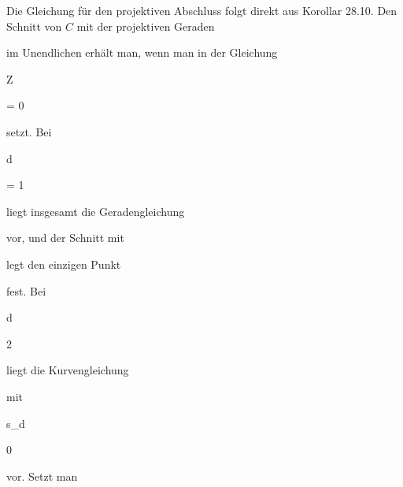 {


Die Gleichung für den projektiven Abschluss folgt direkt aus
Korollar 28.10.
Den Schnitt von $C$ mit der projektiven Geraden

  im Unendlichen erhält man, wenn man in der Gleichung


\mavergleichskette

{\vergleichskette

{Z
}

{ = }{ 0
}

{  }{
}

{    }{
}

{   }{
}

}
{}{}{}
setzt. Bei


\mavergleichskette

{\vergleichskette

{d
}

{ = }{ 1
}

{  }{
}

{    }{
}

{   }{
}

}
{}{}{}
liegt insgesamt die Geradengleichung

 vor, und der Schnitt mit

 legt den einzigen Punkt

 fest. Bei


\mavergleichskette

{\vergleichskette

{d
}

{ \geq }{ 2
}

{  }{
}

{    }{
}

{   }{
}

}
{}{}{}
liegt die Kurvengleichung


 {  }


mit


\mavergleichskette

{\vergleichskette

{s_d
}

{ \neq }{ 0
}

{  }{
}

{    }{
}

{   }{
}

}
{}{}{}
vor. Setzt man


\mavergleichskette

{\vergleichskette

}}
